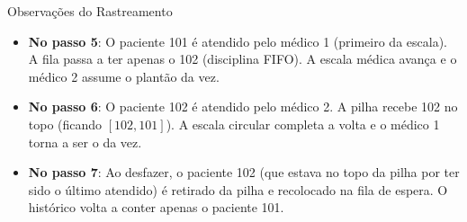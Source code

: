 \documentclass[11pt,a4paper]{article}
\begin{document}
\begin{table}[h!]
\centering
\small
\renewcommand{\arraystretch}{1.3}
\caption{Trace de Estados da Memória durante o Fluxo Clínico}
\end{table}

\begin{destaquebox}{Observações do Rastreamento}
\begin{itemize}
    \item \textbf{No passo 5}: O paciente 101 é atendido pelo médico 1 (primeiro da escala). A fila passa a ter apenas o 102 (disciplina FIFO). A escala médica avança e o médico 2 assume o plantão da vez.
    \item \textbf{No passo 6}: O paciente 102 é atendido pelo médico 2. A pilha recebe 102 no topo (ficando $[102, 101]$). A escala circular completa a volta e o médico 1 torna a ser o da vez.
    \item \textbf{No passo 7}: Ao desfazer, o paciente 102 (que estava no topo da pilha por ter sido o último atendido) é retirado da pilha e recolocado na fila de espera. O histórico volta a conter apenas o paciente 101.
\end{itemize}
\end{destaquebox}
\end{document}
